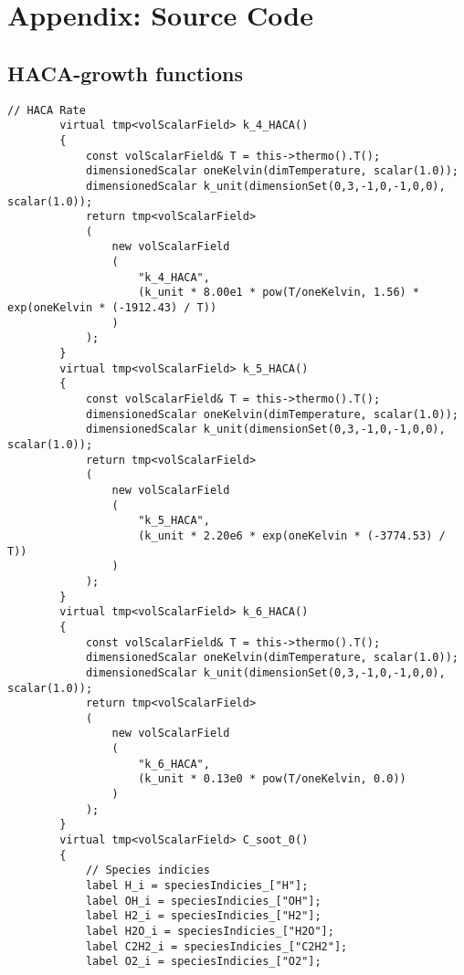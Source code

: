 \chapter{Appendix: Source Code}
\section{HACA-growth functions}
\label{sec:apphaca}

\begin{lstlisting}[style=cpp,title=\texttt{laminarSoot.H},captionpos=t]
        // HACA Rate
        virtual tmp<volScalarField> k_4_HACA()
        {
            const volScalarField& T = this->thermo().T();
            dimensionedScalar oneKelvin(dimTemperature, scalar(1.0));
            dimensionedScalar k_unit(dimensionSet(0,3,-1,0,-1,0,0), scalar(1.0));
            return tmp<volScalarField>
            (
                new volScalarField
                (
                    "k_4_HACA",
                    (k_unit * 8.00e1 * pow(T/oneKelvin, 1.56) * exp(oneKelvin * (-1912.43) / T))
                )
            );
        }
        virtual tmp<volScalarField> k_5_HACA()
        {
            const volScalarField& T = this->thermo().T();
            dimensionedScalar oneKelvin(dimTemperature, scalar(1.0));
            dimensionedScalar k_unit(dimensionSet(0,3,-1,0,-1,0,0), scalar(1.0));
            return tmp<volScalarField>
            (
                new volScalarField
                (
                    "k_5_HACA",
                    (k_unit * 2.20e6 * exp(oneKelvin * (-3774.53) / T))
                )
            );
        } 
        virtual tmp<volScalarField> k_6_HACA()
        {
            const volScalarField& T = this->thermo().T();
            dimensionedScalar oneKelvin(dimTemperature, scalar(1.0));
            dimensionedScalar k_unit(dimensionSet(0,3,-1,0,-1,0,0), scalar(1.0));
            return tmp<volScalarField>
            (
                new volScalarField
                (
                    "k_6_HACA",
                    (k_unit * 0.13e0 * pow(T/oneKelvin, 0.0))
                )
            );
        }       
        virtual tmp<volScalarField> C_soot_0()
        {
            // Species indicies
            label H_i = speciesIndicies_["H"];
            label OH_i = speciesIndicies_["OH"];
            label H2_i = speciesIndicies_["H2"];
            label H2O_i = speciesIndicies_["H2O"];
            label C2H2_i = speciesIndicies_["C2H2"];
            label O2_i = speciesIndicies_["O2"];
            

\end{lstlisting}
